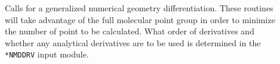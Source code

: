 \begin{description}
\item[] Calls for a generalized numerical geometry
differentiation. These routines will take advantage of the full
molecular point group in order to minimize the number of point to be
calculated. What order of derivatives and whether any analytical
derivatives are to be used is determined in the \verb|*NMDDRV| input
module. 


%




\end{description}
